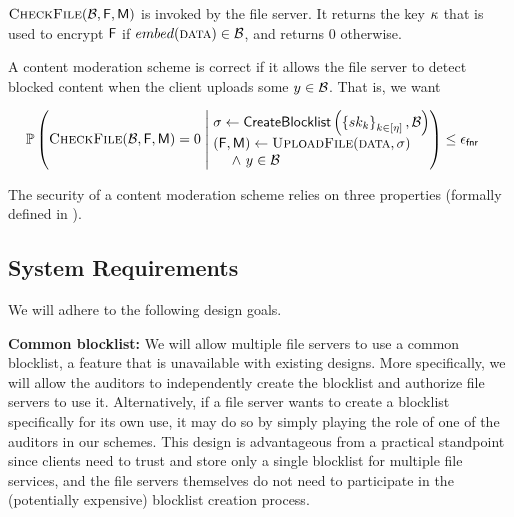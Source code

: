 	\item \underline{$\checkContent(\blocklist,\cOutputFile, \cOutputMeta)$}
          is invoked by the file server.  It returns the key
          $\kappa$ that is used to encrypt $\cOutputFile$
          if $\contentHash(\clientData) \in \blocklist$, and returns 0 otherwise.
\enumListEnd

%
A content moderation scheme is correct if it allows the file server to detect blocked 
content when the client uploads some $\genericCInputElmt \in \blocklist$. That is, we want 

\begin{footnotesize}
	\begin{align*}
	& \cprob{\bigg}{\begin{array}{@{}r@{}}
		\checkContent(\blocklist, \cOutputFile, \cOutputMeta) = 0 
		\end{array}}{\begin{array}[m]{@{}l@{}}
		\genericSig \assign \createBlocklist\left(\setOfAuditorPrivkeys, \blocklist\right) \\
		(\cOutputFile, \cOutputMeta) \assign \uploadFile(\clientData, \genericSig) 
		\\ ~\quad \land ~\genericCInputElmt \in \blocklist
	\end{array}} \le \fnr
\end{align*}
\end{footnotesize}

% 
The security of a content moderation scheme relies on three properties (formally defined in ).
\fi 







\iffalse
\subsection{System Requirements}
%
We will adhere to the following design goals.

\itemListStart
	
	\item \textbf{Common blocklist:} We will allow multiple file servers to use a common blocklist, 
	a feature that is unavailable with existing designs. More specifically, we will allow 
	the auditors to independently create the blocklist and authorize file servers to use it. 
	Alternatively, if a file server wants to create a 	blocklist specifically for its own use, it may do 
	so by simply playing the role of one of the auditors in our schemes. This design is 
	advantageous from a practical standpoint since clients need to trust and store only a single 
	blocklist for multiple file services, and the file servers themselves do not need to participate 
	in the (potentially expensive) blocklist creation process. 
	

